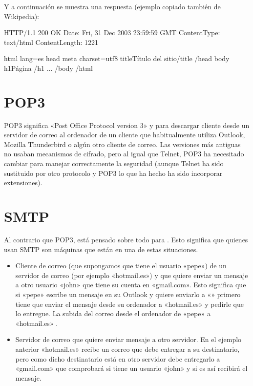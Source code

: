 \documentclass[letterpaper,10pt,spanish]{sphinxmanual}
\begin{document}
Y a continuación se muestra una respuesta (ejemplo copiado también de Wikipedia):

\begin{sphinxVerbatim}[commandchars=\\\{\}]
HTTP/1.1 200 OK
Date: Fri, 31 Dec 2003 23:59:59 GMT
Content\PYGZhy{}Type: text/html
Content\PYGZhy{}Length: 1221

\PYGZlt{}html lang=\PYGZdq{}es\PYGZdq{}\PYGZgt{}
\PYGZlt{}head\PYGZgt{}
\PYGZlt{}meta charset=\PYGZdq{}utf\PYGZhy{}8\PYGZdq{}\PYGZgt{}
\PYGZlt{}title\PYGZgt{}Título del sitio\PYGZlt{}/title\PYGZgt{}
\PYGZlt{}/head\PYGZgt{}
\PYGZlt{}body\PYGZgt{}
\PYGZlt{}h1\PYGZgt{}Página \PYGZlt{}/h1\PYGZgt{}
    ...
\PYGZlt{}/body\PYGZgt{}
\PYGZlt{}/html\PYGZgt{}
\end{sphinxVerbatim}


\section{POP3}
\label{\detokenize{textos/tema4:pop3}}
POP3 significa «Post Office Protocol version 3» y  para descargar cliente desde un servidor de correo al ordenador de un cliente que habitualmente utiliza Outlook, Mozilla Thunderbird o algún otro cliente de correo. Las versiones más antiguas no usaban mecanismos de cifrado, pero al igual que Telnet, POP3 ha necesitado cambiar para manejar correctamente la seguridad (aunque Telnet ha sido sustituido por otro protocolo y POP3 lo que ha hecho ha sido incorporar extensiones).


\section{SMTP}
\label{\detokenize{textos/tema4:smtp}}
Al contrario que POP3, está pensado sobre todo para . Esto significa que quienes usan SMTP son máquinas que están en una de estas situaciones.
\begin{itemize}
\item {} 
Cliente de correo (que supongamos que tiene el usuario «pepe») de un servidor de correo (por ejemplo «hotmail.es») y que quiere enviar un mensaje a otro usuario «john» que tiene su cuenta en «gmail.com». Esto significa que si «pepe» escribe un mensaje en su Outlook y quiere enviarlo a «» primero tiene que enviar el mensaje desde su ordenador a «hotmail.es» y pedirle que lo entregue. La subida del correo desde el ordenador de «pepe» a «hotmail.es» .

\item {} 
Servidor de correo que quiere enviar mensaje a otro servidor. En el ejemplo anterior «hotmail.es» recibe un correo que debe entregar a su destinatario, pero como dicho destinatario está en otro servidor debe entregarlo a «gmail.com» que comprobará si tiene un usuario «john» y si es así recibirá el mensaje. 

\end{itemize}
\end{document}
